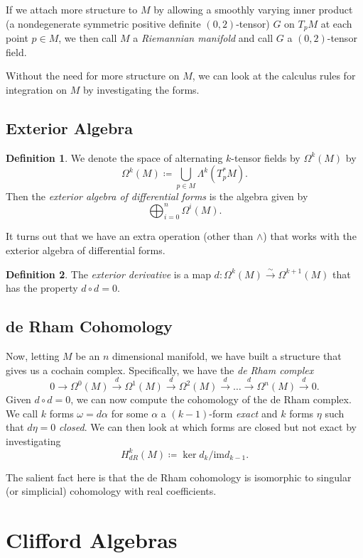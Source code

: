\documentclass[12pt]{article}
\newcommand{\linmap}{\overset{\sim}{\longrightarrow}}
\newcommand{\dmap}{\overset{d}{\longrightarrow}}
\theoremstyle{definition}
\newtheorem{definition}{Definition}[section]
\begin{document}
If we attach more structure to $M$ by allowing a smoothly varying inner product (a nondegenerate symmetric positive definite $(0,2)$-tensor) $G$ on $T_pM$ at each point $p \in M$, we then call $M$ a \emph{Riemannian manifold} and call $G$ a $(0,2)$-tensor field.

Without the need for more structure on $M$, we can look at the calculus rules for integration on $M$ by investigating the forms.

\subsection{Exterior Algebra}

\begin{definition}
We denote the space of alternating $k$-tensor fields by $\Omega^k(M)$ by
\[
\Omega^k(M)\coloneqq \bigcup_{p\in M} \Lambda^k(T_p^*M).
\]
Then the \emph{exterior algebra of differential forms} is the algebra given by
\[
\bigoplus_{i=0}^n \Omega^i(M).
\]
\end{definition}
It turns out that we have an extra operation (other than $\wedge$) that works with the exterior algebra of differential forms.

\begin{definition}
The \emph{exterior derivative} is a map $d\colon \Omega^k(M)\linmap \Omega^{k+1}(M)$ that has the property $d\circ d =0$.  
\end{definition}

\subsection{de Rham Cohomology}
Now, letting $M$ be an $n$ dimensional manifold, we have built a structure that gives us a cochain complex.  Specifically, we have the \emph{de Rham complex}
\[
0\to \Omega^0(M)\dmap \Omega^1(M)\dmap \Omega^2(M)\dmap \dots \dmap \Omega^n(M)\dmap 0.
\]
Given $d \circ d=0$, we can now compute the cohomology of the de Rham complex. We call $k$ forms $\omega = d\alpha$ for some $\alpha$ a $(k-1)$-form \emph{exact} and $k$ forms $\eta$ such that $d\eta=0$ \emph{closed}.  We can then look at which forms are closed but not exact by investigating
\[
H_{dR}^k(M)\coloneqq \ker{d_{k}}/\mathrm{im} d_{k-1}.
\]

The salient fact here is that the de Rham cohomology is isomorphic to singular (or simplicial) cohomology with real coefficients.  

\section{Clifford Algebras}
\end{document}
